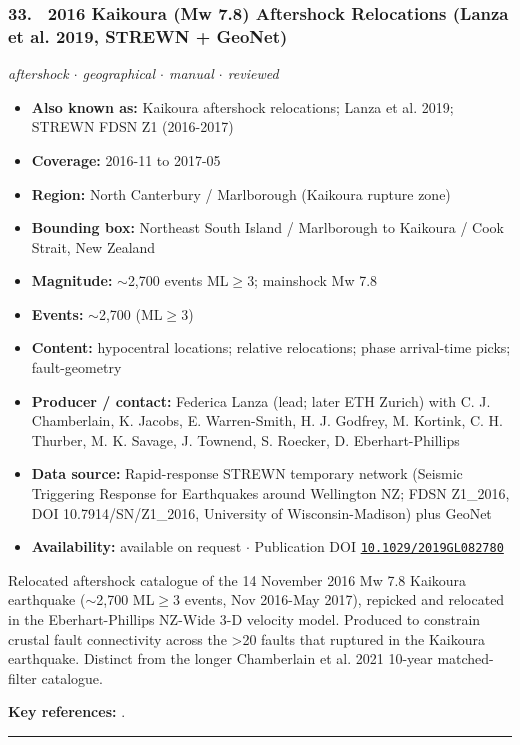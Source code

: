\documentclass[10pt,a4paper]{article}
\newcommand{\catentryrule}{\par\vspace{3pt}\noindent\textcolor{rulegrey}{\rule{\linewidth}{0.3pt}}\par\vspace{5pt}}
\newcommand{\kv}[2]{\item \textbf{#1:} #2}
\begin{document}
\subsubsection*{\hypertarget{c:33}{33.}~ 2016 Kaikoura (Mw 7.8) Aftershock Relocations (Lanza et al. 2019, STREWN + GeoNet)}
{\small\itshape aftershock $\cdot$ geographical $\cdot$ manual $\cdot$ reviewed}\par\vspace{2pt}
\begin{itemize}[leftmargin=1.3em,itemsep=0.6pt,topsep=1pt,parsep=0pt]
\kv{Also known as}{Kaikoura aftershock relocations; Lanza et al. 2019; STREWN FDSN Z1 (2016-2017)}
\kv{Coverage}{2016-11 to 2017-05}
\kv{Region}{North Canterbury / Marlborough (Kaikoura rupture zone)}
\kv{Bounding box}{Northeast South Island / Marlborough to Kaikoura / Cook Strait, New Zealand}
\kv{Magnitude}{$\sim$2,700 events ML$\geq$3; mainshock Mw 7.8}
\kv{Events}{$\sim$2,700 (ML$\geq$3)}
\kv{Content}{hypocentral locations; relative relocations; phase arrival-time picks; fault-geometry}
\kv{Producer / contact}{Federica Lanza (lead; later ETH Zurich) with C. J. Chamberlain, K. Jacobs, E. Warren-Smith, H. J. Godfrey, M. Kortink, C. H. Thurber, M. K. Savage, J. Townend, S. Roecker, D. Eberhart-Phillips}
\kv{Data source}{Rapid-response STREWN temporary network (Seismic Triggering Response for Earthquakes around Wellington NZ; FDSN Z1\_2016, DOI 10.7914/SN/Z1\_2016, University of Wisconsin-Madison) plus GeoNet}
\kv{Availability}{available on request $\cdot$ Publication DOI \href{https://doi.org/10.1029/2019GL082780}{\nolinkurl{10.1029/2019GL082780}}}
\end{itemize}
\par\vspace{2pt}Relocated aftershock catalogue of the 14 November 2016 Mw 7.8 Kaikoura earthquake ($\sim$2,700 ML$\geq$3 events, Nov 2016-May 2017), repicked and relocated in the Eberhart-Phillips NZ-Wide 3-D velocity model. Produced to constrain crustal fault connectivity across the \textgreater{}20 faults that ruptured in the Kaikoura earthquake. Distinct from the longer Chamberlain et al. 2021 10-year matched-filter catalogue.
\par\vspace{2pt}\textbf{Key references:} \cite{Lanza2019,STREWNSeismicTriggeringResponseforEarthquakesaroundWellingtonNZ2016}.
\catentryrule
\end{document}
